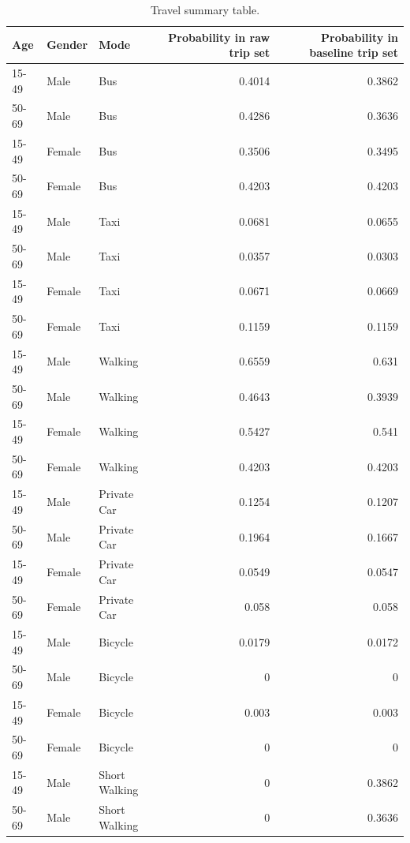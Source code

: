 \documentclass{article}
\begin{document}
\begin{appendix}
\begin{center}
\begin{ThreePartTable}
  \begin{TableNotes}  
  \small
  \end{TableNotes}
\begin{longtable}{lll|rr}
\caption{\small Travel summary table.  }\label{calculations}\\
Age & Gender & Mode & Probability in raw trip set & Probability in baseline trip set  \\
\hline
15-49 &  Male &  Bus & 0.4014 &  0.3862\\ 
50-69 &  Male &  Bus & 0.4286 &  0.3636   \\ 
15-49 &  Female &  Bus & 0.3506 &  0.3495   \\ 
50-69 &  Female &  Bus & 0.4203 &  0.4203 \\ 
15-49 &  Male &  Taxi & 0.0681 & 0.0655  \\ 
50-69 &  Male &  Taxi & 0.0357 & 0.0303  \\ 
15-49 &  Female &  Taxi & 0.0671 & 0.0669  \\ 
50-69 &  Female &  Taxi & 0.1159 & 0.1159  \\ 
15-49 &  Male &  Walking & 0.6559 & 0.631 \\ 
50-69 &  Male &  Walking & 0.4643 &   0.3939 \\ 
15-49 &  Female &  Walking & 0.5427 & 0.541  \\ 
50-69 &  Female &  Walking & 0.4203 &  0.4203 \\ 
15-49 &  Male &  Private Car & 0.1254 & 0.1207  \\ 
50-69 &  Male &  Private Car & 0.1964 &   0.1667 \\ 
15-49 &  Female &  Private Car & 0.0549 &   0.0547 \\ 
50-69 &  Female &  Private Car & 0.058 &  0.058 \\ 
15-49 &  Male &  Bicycle & 0.0179 &  0.0172 \\ 
50-69 &  Male &  Bicycle & 0 &  0 \\ 
15-49 &  Female &  Bicycle & 0.003 & 0.003\\ 
50-69 &  Female &  Bicycle & 0 & 0 \\ 
15-49 &  Male & Short Walking & 0 & 0.3862 \\ 
50-69 &  Male &  Short Walking & 0 & 0.3636 \\ 

\end{longtable}
\end{ThreePartTable}
\end{center}
\end{appendix}
\end{document}
